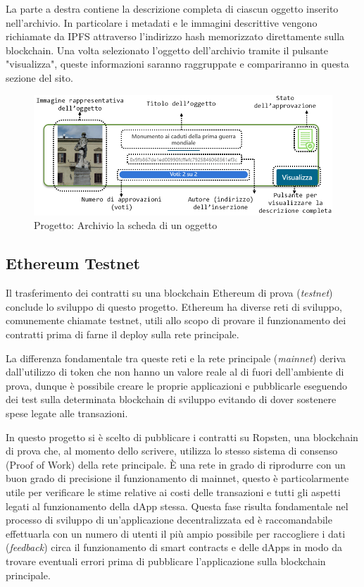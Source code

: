 La parte a destra contiene la descrizione completa di ciascun oggetto inserito nell'archivio. In particolare i metadati e le immagini descrittive vengono richiamate da IPFS attraverso l'indirizzo hash memorizzato direttamente sulla blockchain. Una volta selezionato l'oggetto dell'archivio tramite il pulsante "visualizza", queste informazioni saranno raggruppate e compariranno in questa sezione del sito. 

\begin{figure}[H]
\centering
\includegraphics[width=1\textwidth]{immagini/artworkFocusCommented.png}
\caption{Progetto: Archivio la scheda di un oggetto}
\label{fig:artworkFocus}
\end{figure}

\subsection{Ethereum Testnet}

Il trasferimento dei contratti su una blockchain Ethereum di prova (\emph{testnet}) conclude lo sviluppo di questo progetto. Ethereum ha diverse reti di sviluppo, comunemente chiamate testnet, utili allo scopo di provare il funzionamento dei contratti prima di farne il deploy sulla rete principale. 

La differenza fondamentale tra queste reti e la rete principale (\emph{mainnet}) deriva dall’utilizzo di token che non hanno un valore reale al di fuori dell'ambiente di prova, dunque è possibile creare le proprie applicazioni e pubblicarle eseguendo dei test sulla determinata blockchain di sviluppo evitando di dover sostenere spese legate alle transazioni.

In questo progetto si è scelto di pubblicare i contratti su Ropsten, una blockchain di prova che, al momento dello scrivere, utilizza lo stesso sistema di consenso (Proof of Work) della rete principale. È una rete in grado di riprodurre con un buon grado di precisione il funzionamento di mainnet, questo è particolarmente utile per verificare le stime relative ai costi delle transazioni e tutti gli aspetti legati al funzionamento della dApp stessa. Questa fase risulta fondamentale nel processo di sviluppo di un’applicazione decentralizzata ed è raccomandabile effettuarla con un numero di utenti il più ampio possibile per raccogliere i dati (\emph{feedback}) circa il funzionamento di smart contracts e delle dApps in modo da trovare eventuali errori prima di pubblicare l'applicazione sulla blockchain principale.